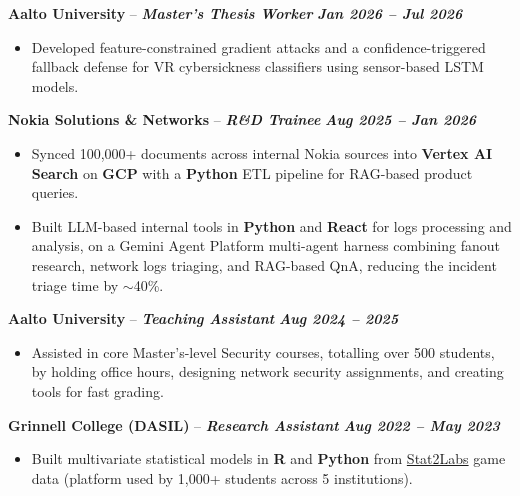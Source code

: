\documentclass[11pt,a4paper]{article}
\newcommand{\experienceheader}[3]{%
    \Needspace{7\baselineskip}%
    \noindent\textbf{#1} -- \textbf{\textit{#2}} \hfill \textbf{\textit{#3}}%
}
\begin{document}
\vspace{3pt}

\experienceheader{Aalto University}{Master's Thesis Worker}{Jan 2026 -- Jul 2026}
\begin{itemize}
    \item Developed feature-constrained gradient attacks and a confidence-triggered fallback defense for VR cybersickness classifiers using sensor-based LSTM models.
\end{itemize}

\vspace{3pt}

\experienceheader{Nokia Solutions \& Networks}{R\&D Trainee}{Aug 2025 -- Jan 2026}
\begin{itemize}
    \item Synced 100,000+ documents across internal Nokia sources into \textbf{Vertex AI Search} on \textbf{GCP} with a \textbf{Python} ETL pipeline for RAG-based product queries.
    \item Built LLM-based internal tools in \textbf{Python} and \textbf{React} for logs processing and analysis, on a Gemini Agent Platform multi-agent harness combining fanout research, network logs triaging, and RAG-based QnA, reducing the incident triage time by $\sim$40\%.
\end{itemize}

\vspace{3pt}

\experienceheader{Aalto University}{Teaching Assistant}{Aug 2024 -- 2025}
\begin{itemize}
    \item Assisted in core Master's-level Security courses, totalling over 500 students, by holding office hours, designing network security assignments, and creating tools for fast grading.
\end{itemize}

\vspace{3pt}

\experienceheader{Grinnell College (DASIL)}{Research Assistant}{Aug 2022 -- May 2023}
\begin{itemize}
    \item Built multivariate statistical models in \textbf{R} and \textbf{Python} from \href{https://stat2labs.sites.grinnell.edu/}{Stat2Labs} game data (platform used by 1,000+ students across 5 institutions).
\end{itemize}

\vspace{3pt}
\end{document}
